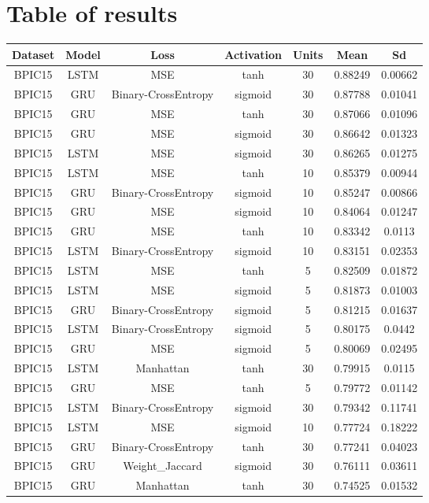 \documentclass{article}%
\begin{document}
%
\normalsize%
\section{Table of results}%
\label{sec:Tableofresults}%
\begin{longtable}{|c|c|c|c|c|c|c|}%
\hline%
\rowcolor{lightgray!70}%
\textbf{Dataset}&\textbf{Model}&\textbf{Loss}&\textbf{Activation}&\textbf{Units}&\textbf{Mean}&\textbf{Sd}\\%
\hline%
BPIC15&LSTM&MSE&tanh&30&0.88249&0.00662\\%
\hline%
BPIC15&GRU&Binary{-}CrossEntropy&sigmoid&30&0.87788&0.01041\\%
\hline%
BPIC15&GRU&MSE&tanh&30&0.87066&0.01096\\%
\hline%
BPIC15&GRU&MSE&sigmoid&30&0.86642&0.01323\\%
\hline%
BPIC15&LSTM&MSE&sigmoid&30&0.86265&0.01275\\%
\hline%
BPIC15&LSTM&MSE&tanh&10&0.85379&0.00944\\%
\hline%
BPIC15&GRU&Binary{-}CrossEntropy&sigmoid&10&0.85247&0.00866\\%
\hline%
BPIC15&GRU&MSE&sigmoid&10&0.84064&0.01247\\%
\hline%
BPIC15&GRU&MSE&tanh&10&0.83342&0.0113\\%
\hline%
BPIC15&LSTM&Binary{-}CrossEntropy&sigmoid&10&0.83151&0.02353\\%
\hline%
BPIC15&LSTM&MSE&tanh&5&0.82509&0.01872\\%
\hline%
BPIC15&LSTM&MSE&sigmoid&5&0.81873&0.01003\\%
\hline%
BPIC15&GRU&Binary{-}CrossEntropy&sigmoid&5&0.81215&0.01637\\%
\hline%
BPIC15&LSTM&Binary{-}CrossEntropy&sigmoid&5&0.80175&0.0442\\%
\hline%
BPIC15&GRU&MSE&sigmoid&5&0.80069&0.02495\\%
\hline%
BPIC15&LSTM&Manhattan&tanh&30&0.79915&0.0115\\%
\hline%
BPIC15&GRU&MSE&tanh&5&0.79772&0.01142\\%
\hline%
BPIC15&LSTM&Binary{-}CrossEntropy&sigmoid&30&0.79342&0.11741\\%
\hline%
BPIC15&LSTM&MSE&sigmoid&10&0.77724&0.18222\\%
\hline%
BPIC15&GRU&Binary{-}CrossEntropy&tanh&30&0.77241&0.04023\\%
\hline%
BPIC15&GRU&Weight\_Jaccard&sigmoid&30&0.76111&0.03611\\%
\hline%
BPIC15&GRU&Manhattan&tanh&30&0.74525&0.01532\\%

\end{longtable}
\end{document}
